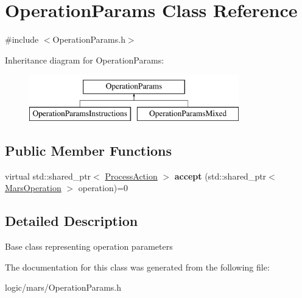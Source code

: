 \hypertarget{classOperationParams}{}\section{Operation\+Params Class Reference}
\label{classOperationParams}


{\ttfamily \#include $<$Operation\+Params.\+h$>$}

Inheritance diagram for Operation\+Params\+:\begin{figure}[H]
\begin{center}
\leavevmode
\includegraphics[height=2.000000cm]{classOperationParams}
\end{center}
\end{figure}
\subsection*{Public Member Functions}
\begin{DoxyCompactItemize}
\item 
\mbox{\label{classOperationParams_a6753b99754fce0886dbe484d275c3c6a}} 
virtual std\+::shared\+\_\+ptr$<$ \hyperlink{classProcessAction}{Process\+Action} $>$ {\bfseries accept} (std\+::shared\+\_\+ptr$<$ \hyperlink{classMarsOperation}{Mars\+Operation} $>$ operation)=0
\end{DoxyCompactItemize}


\subsection{Detailed Description}
Base class representing operation parameters 

The documentation for this class was generated from the following file\+:\begin{DoxyCompactItemize}
\item 
logic/mars/Operation\+Params.\+h\end{DoxyCompactItemize}
